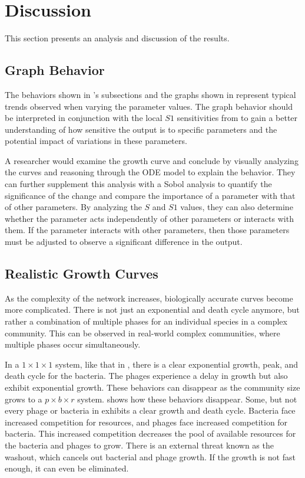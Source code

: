 \chapter{Discussion}
\label{Discussion}
This section presents an analysis and discussion of the results. 

\section{Graph Behavior}
The behaviors shown in  ’s subsections and the graphs shown in  represent typical trends observed when varying the parameter values. 
The graph behavior should be interpreted in conjunction with the local $S1$ sensitivities from  to gain a better understanding of how sensitive the output is to specific parameters and the potential impact of variations in these parameters.

A researcher would examine the growth curve and conclude by visually analyzing the curves and reasoning through the ODE model to explain the behavior. 
They can further supplement this analysis with a Sobol analysis to quantify the significance of the change and compare the importance of a parameter with that of other parameters. 
By analyzing the $S$ and $S1$ values, they can also determine whether the parameter acts independently of other parameters or interacts with them. 
If the parameter interacts with other parameters, then those parameters must be adjusted to observe a significant difference in the output. 

\section{Realistic Growth Curves}
As the complexity of the network increases, biologically accurate curves become more complicated. 
There is not just an exponential and death cycle anymore, but rather a combination of multiple phases for an individual species in a complex community. 
This can be observed in real-world complex communities, where multiple phases occur simultaneously. 

In a $1\times 1\times 1$ system, like that in , there is a clear exponential growth, peak, and death cycle for the bacteria. 
The phages experience a delay in growth but also exhibit exponential growth. 
These behaviors can disappear as the community size grows to a $p\times b\times r$ system. 
 shows how these behaviors disappear. 
Some, but not every phage or bacteria in  exhibits a clear growth and death cycle. 
Bacteria face increased competition for resources, and phages face increased competition for bacteria. 
This increased competition decreases the pool of available resources for the bacteria and phages to grow. 
There is an external threat known as the washout, which cancels out bacterial and phage growth. If the growth is not fast enough, it can even be eliminated. 

